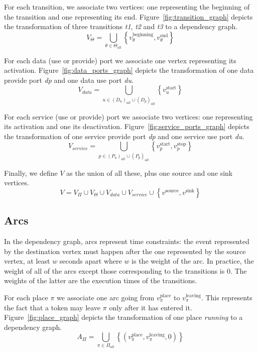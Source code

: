 For each transition, we associate two vertices: one representing the
beginning of the transition and one representing its end.
Figure~\ref{fig:transition_graph} depicts the transformation of three
transitions \emph{t1}, \emph{t2} and \emph{t3} to a dependency graph.
\[
V_{\Theta}=\bigcup_{\theta\in\Theta_{all}}\left\{ v_\theta^\text{beginning},v_\theta^\text{end}\right\} 
\]

For each data (use or provide) port we associate one vertex representing
its activation.
Figure~\ref{fig:data_ports_graph} depicts the transformation of one
data provide port \emph{dp} and one data use port \emph{du}.
\[
V_{data}=\bigcup_{u\in\left(D_{u}\right)_{all}\cup\left(D_{p}\right)_{all}}\left\{ v_u^\text{start}\right\} 
\]

For each service (use or provide) port we associate two vertices:
one representing its activation and one its deactivation.
Figure~\ref{fig:service_ports_graph} depicts the transformation of one
service provide port \emph{dp} and one service use port \emph{du}.
\[
V_{service}=\bigcup_{p\in\left(P_{u}\right)_{all}\cup\left(P_{p}\right)_{all}}\left\{v_p^\text{start},v_p^\text{stop}\right\} 
\]

Finally, we define $V$ as the union of all these, plus one source
and one sink vertices. 
\[
V=V_{\Pi}\cup V_{\Theta}\cup V_{data}\cup V_{service}\cup\left\{ v^\text{source},v^\text{sink}\right\} 
\]


\subsection{Arcs}

In the dependency graph, arcs represent time constraints: the event represented
by the destination vertex must happen after the one represented by the source
vertex, at least $w$ seconds apart where $w$ is the weight of the arc. In
practice, the weight of all of the arcs except those corresponding to the
transitions is 0. The weights of the latter are the execution times of the
transitions.

For each place $\pi$ we associate one arc going from $v_\pi^\text{place}$ to
$v_\pi^\text{leaving}$. This represents the fact that a token may leave $\pi$
only after it has entered it.
Figure~\ref{fig:place_graph} depicts the transformation of one place
\emph{running} to a dependency graph.
\[
A_{\Pi}=\bigcup_{\pi\in\Pi_{all}}\left\{ \left(v_\pi^\text{place},v_\pi^\text{leaving},0\right)\right\} 
\]

